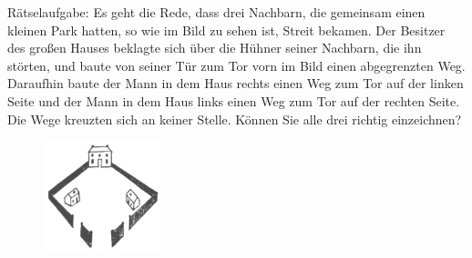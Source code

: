 Rätselaufgabe: Es geht die Rede, dass drei Nachbarn, die gemeinsam einen kleinen Park hatten, so wie im Bild zu sehen ist, Streit bekamen. Der Besitzer des großen Hauses beklagte sich über die Hühner seiner Nachbarn, die ihn störten, und baute von seiner Tür zum Tor vorn im Bild einen abgegrenzten Weg. Daraufhin baute der Mann in dem Haus rechts einen Weg zum Tor auf der linken Seite und der Mann in dem Haus links einen Weg zum Tor auf der rechten Seite.
Die Wege kreuzten sich an keiner Stelle. Können Sie alle drei richtig einzeichnen?

\begin{figure}[ht]
	\centering
  \includegraphics[width=0.3\textwidth]{../pool/ex-graph-theory-1-img-a.png}
	\label{fig1}
\end{figure}

